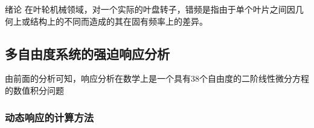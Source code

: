 
\begin{chapter}{绪论}
    在叶轮机械领域，对一个实际的叶盘转子，错频是指由于单个叶片之间因几何上或结构上的不同而造成的其在固有频率上的差异。
    \subsection{多自由度系统的强迫响应分析}
    由前面的分析可知，响应分析在数学上是一个具有38个自由度的二阶线性微分方程的数值积分问题
    \subsubsection{动态响应的计算方法}
\end{chapter}